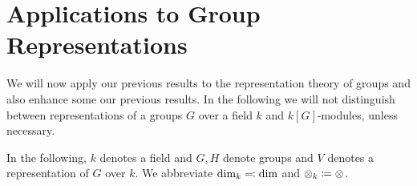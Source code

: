 \section{Applications to Group Representations}


\begin{fluff}
  We will now apply our previous results to the representation theory of groups and also enhance some our previous results.
  In the following we will not distinguish between representations of a groups $G$ over a field $k$ and $k[G]$-modules, unless necessary.
\end{fluff}


\begin{conventions}
  In the following, $k$ denotes a field and $G, H$ denote groups and $V$ denotes a representation of $G$ over $k$.
  We abbreviate $\dim_k \eqqcolon \dim$ and $\mathbin{\otimes}_k \coloneqq \mathbin{\otimes}$.
\end{conventions}









